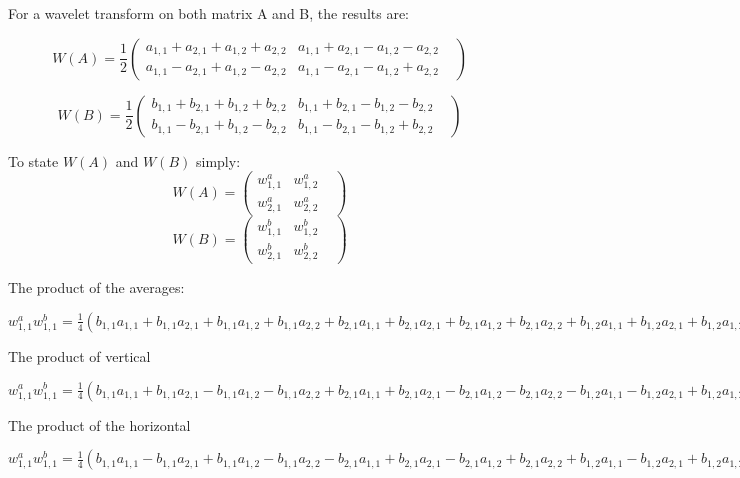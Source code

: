 \documentclass[11pt]{book}
\begin{document}
For a wavelet transform on both matrix A and B, the results are:

\[
W(A) = \frac{1}{2} \left(
\begin{array}{ccc}
  a_{1,1} + a_{2,1} + a_{1,2} + a_{2,2} &  a_{1,1} + a_{2,1} - a_{1,2} - a_{2,2} &   \\
 a_{1,1} - a_{2,1} + a_{1,2} - a_{2,2} &  a_{1,1} - a_{2,1} - a_{1,2} + a_{2,2} &   
\end{array}
\right)
\]

\[
W(B) = \frac{1}{2} \left(
\begin{array}{ccc}
  b_{1,1} + b_{2,1} + b_{1,2} + b_{2,2} &  b_{1,1} + b_{2,1} - b_{1,2} - b_{2,2} &   \\
 b_{1,1} - b_{2,1} + b_{1,2} - b_{2,2} &  b_{1,1} - b_{2,1} - b_{1,2} + b_{2,2} &   
\end{array}
\right)
\]

To state $W(A)$ and $W(B)$ simply:
\[
W(A) = \left(
\begin{array}{ccc}
  w^a_{1,1}&  w^a_{1,2} &   \\
 w^a_{2,1} &  w^a_{2,2} &   
\end{array}
\right)
\]
\[
W(B) = \left(
\begin{array}{ccc}
  w^b_{1,1}&  w^b_{1,2} &   \\
 w^b_{2,1} &  w^b_{2,2} &   
\end{array}
\right)
\]

The product of the averages:

$w^a_{1,1} w^b_{1,1} = \frac{1}{4} (
b_{1,1} a_{1,1} + b_{1,1} a_{2,1} + b_{1,1} a_{1,2} +b_{1,1} a_{2,2}  
+ b_{2,1} a_{1,1} + b_{2,1} a_{2,1} + b_{2,1} a_{1,2} +b_{2,1} a_{2,2}  
+ b_{1,2} a_{1,1} + b_{1,2} a_{2,1} + b_{1,2} a_{1,2} +b_{1,2} a_{2,2} 
 + b_{2,2} a_{1,1} + b_{2,2} a_{2,1} + b_{2,2} a_{1,2} +b_{2,2} a_{2,2}  )$

The product of vertical 

$w^a_{1,1} w^b_{1,1} = \frac{1}{4} (
b_{1,1} a_{1,1} + b_{1,1} a_{2,1} -  b_{1,1} a_{1,2} - b_{1,1} a_{2,2}  
+ b_{2,1} a_{1,1} + b_{2,1} a_{2,1} - b_{2,1} a_{1,2} - b_{2,1} a_{2,2} 
 - b_{1,2} a_{1,1} - b_{1,2} a_{2,1} + b_{1,2} a_{1,2} +b_{1,2} a_{2,2} 
  - b_{2,2} a_{1,1} - b_{2,2} a_{2,1} + b_{2,2} a_{1,2} +b_{2,2} a_{2,2}  )$


The product of the horizontal

 $w^a_{1,1} w^b_{1,1} = \frac{1}{4} (
 b_{1,1} a_{1,1} - b_{1,1} a_{2,1} + b_{1,1} a_{1,2} - b_{1,1} a_{2,2}  
 - b_{2,1} a_{1,1} + b_{2,1} a_{2,1} - b_{2,1} a_{1,2} + b_{2,1} a_{2,2}  
 +  b_{1,2} a_{1,1} - b_{1,2} a_{2,1} + b_{1,2} a_{1,2}  - b_{1,2} a_{2,2}  
 -  b_{2,2} a_{1,1} + b_{2,2} a_{2,1} - b_{2,2} a_{1,2} +b_{2,2} a_{2,2}  )$
\end{document}
